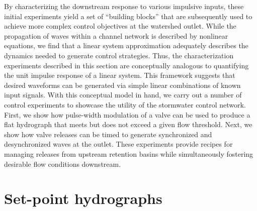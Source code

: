 By characterizing the downstream response to various impulsive inputs, these initial experiments yield a set of ``building blocks” that are subsequently used to achieve more complex control objectives at the watershed outlet.
While the propagation of waves within a channel network is described by nonlinear equations, we find that a linear system approximation adequately describes the dynamics needed to generate control strategies. %
Thus, the characterization experiments described in this section are conceptually analogous to quantifying the unit impulse response of a linear system. This framework suggests that desired waveforms can be generated via simple linear combinations of known input signals.
With this conceptual model in hand, we carry out a number of control experiments to showcase the utility of the stormwater control network. First, we show how pulse-width modulation of a valve can be used to produce a flat hydrograph that meets but does not exceed a given flow threshold. Next, we show how valve releases can be timed to generate synchronized and desynchronized waves at the outlet. These experiments provide recipes for managing releases from upstream retention basins while simultaneously fostering desirable flow conditions downstream.

\section{Set-point hydrographs}

